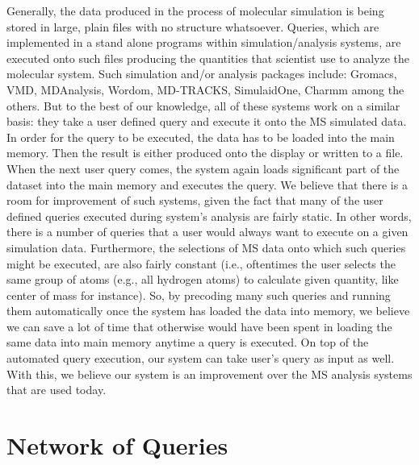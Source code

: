 \documentclass[10pt,journal,final,letterpaper,twocolumn]{IEEEtran}
\begin{document}
Generally, the data produced in the process of molecular simulation
is being stored in large, plain files with no structure whatsoever.
Queries, which are implemented in a stand alone programs within
simulation/analysis systems, are executed onto such files producing
the quantities that scientist use to analyze the molecular system.
Such simulation and/or analysis packages include: Gromacs, VMD,
MDAnalysis, Wordom, MD-TRACKS, SimulaidOne, Charmm among the others.
But to the best of our knowledge, all of these systems work on a
similar basis: they take a user defined query and execute it onto
the MS simulated data. In order for the query to be executed, the
data has to be loaded into the main memory. Then the result is
either produced onto the display or written to a file. When the next
user query comes, the system again loads significant part of the
dataset into the main memory and executes the query. We believe that
there is a room for improvement of such systems, given the fact that
many of the user defined queries executed during system's analysis
are fairly static. In other words, there is a number of queries that
a user would always want to execute on a given simulation data.
Furthermore, the selections of MS data onto which such queries might
be executed, are also fairly constant (i.e., oftentimes the user
selects the same group of atoms (e.g., all hydrogen atoms) to
calculate given quantity, like center of mass for instance). So, by
precoding many such queries and running them automatically once the
system has loaded the data into memory, we believe we can save a lot
of time that otherwise would have been spent in loading the same
data into main memory anytime a query is executed. On top of the
automated query execution, our system can take user's query as input
as well. With this, we believe our system is an improvement over the
MS analysis systems that are used today.



\section{Network of Queries}\label{sc:querynetwork}
\end{document}
